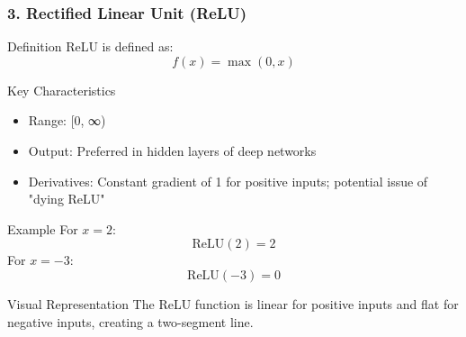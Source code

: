 \documentclass[aspectratio=169]{beamer}
\begin{document}
\begin{frame}[fragile]
    \frametitle{3. Rectified Linear Unit (ReLU)}
    \begin{block}{Definition}
        ReLU is defined as:
        \begin{equation}
            f(x) = \max(0, x)
        \end{equation}
    \end{block}

    \begin{block}{Key Characteristics}
        \begin{itemize}
            \item Range: [0, ∞)
            \item Output: Preferred in hidden layers of deep networks
            \item Derivatives: Constant gradient of 1 for positive inputs; potential issue of "dying ReLU"
        \end{itemize}
    \end{block}

    \begin{block}{Example}
        For \( x = 2 \):
        \begin{equation}
            \text{ReLU}(2) = 2
        \end{equation}
        For \( x = -3 \):
        \begin{equation}
            \text{ReLU}(-3) = 0
        \end{equation}
    \end{block}

    \begin{block}{Visual Representation}
        The ReLU function is linear for positive inputs and flat for negative inputs, creating a two-segment line.
    \end{block}
\end{frame}
\end{document}
